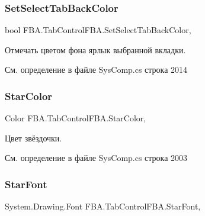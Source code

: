 \subsubsection{\texorpdfstring{Set\+Select\+Tab\+Back\+Color}{SetSelectTabBackColor}}
{\footnotesize\ttfamily bool F\+B\+A.\+Tab\+Control\+F\+B\+A.\+Set\+Select\+Tab\+Back\+Color\hspace{0.3cm}{\ttfamily [get]}, {\ttfamily [set]}}



Отмечать цветом фона ярлык выбранной вкладки. 



См. определение в файле Sys\+Comp.\+cs строка 2014

\mbox{\label{class_f_b_a_1_1_tab_control_f_b_a_ac57c7c4c7e8864517e2953b08251b827}} 
\subsubsection{\texorpdfstring{Star\+Color}{StarColor}}
{\footnotesize\ttfamily Color F\+B\+A.\+Tab\+Control\+F\+B\+A.\+Star\+Color\hspace{0.3cm}{\ttfamily [get]}, {\ttfamily [set]}}



Цвет звёздочки. 



См. определение в файле Sys\+Comp.\+cs строка 2003

\mbox{\label{class_f_b_a_1_1_tab_control_f_b_a_ae976698842802922a3ef2aca4e1f027d}} 
\subsubsection{\texorpdfstring{Star\+Font}{StarFont}}
{\footnotesize\ttfamily System.\+Drawing.\+Font F\+B\+A.\+Tab\+Control\+F\+B\+A.\+Star\+Font\hspace{0.3cm}{\ttfamily [get]}, {\ttfamily [set]}}



